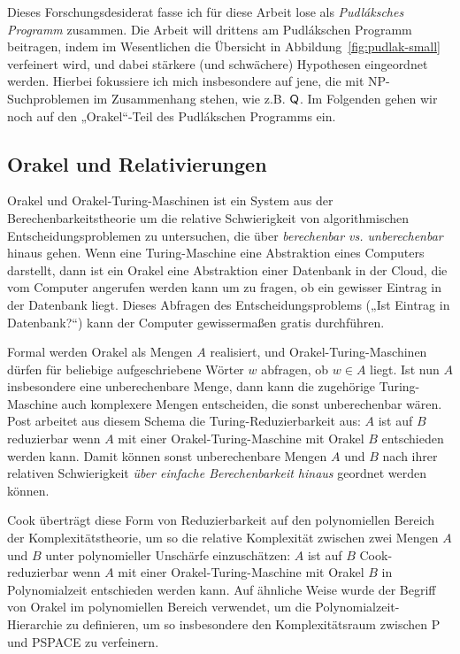 Dieses Forschungsdesiderat fasse ich für diese Arbeit lose als \emph{Pudláksches Programm} zusammen.
Die Arbeit will drittens am Pudlákschen Programm beitragen, indem im Wesentlichen die Übersicht in Abbildung~\ref{fig:pudlak-small} verfeinert wird, und dabei stärkere (und schwächere) Hypothesen eingeordnet werden. Hierbei fokussiere ich mich insbesondere auf jene, die mit NP-Suchproblemen im Zusammenhang stehen, wie z.B. $\mathsf{Q}$.
Im Folgenden gehen wir noch auf den „Orakel“-Teil des Pudlákschen Programms ein.

\subsection*{Orakel und Relativierungen}

Orakel und Orakel-Turing-Maschinen ist ein System aus der Berechenbarkeitstheorie um die relative Schwierigkeit von algorithmischen Entscheidungsproblemen zu untersuchen, die über \emph{berechenbar vs. unberechenbar} hinaus gehen. Wenn eine Turing-Maschine eine Abstraktion eines Computers darstellt, dann ist ein Orakel eine Abstraktion einer Datenbank in der Cloud, die vom Computer angerufen werden kann um zu fragen, ob ein gewisser Eintrag in der Datenbank liegt. Dieses Abfragen des Entscheidungsproblems („Ist Eintrag in Datenbank?“) kann der Computer gewissermaßen gratis durchführen.

Formal werden Orakel als Mengen $A$ realisiert, und Orakel-Turing-Maschinen dürfen für beliebige aufgeschriebene Wörter $w$ abfragen, ob $w\in A$ liegt. Ist nun $A$ insbesondere eine unberechenbare Menge, dann kann die zugehörige Turing-Maschine auch komplexere Mengen entscheiden, die sonst unberechenbar wären.
Post arbeitet aus diesem Schema die Turing-Reduzierbarkeit aus: $A$ ist auf $B$ reduzierbar wenn $A$ mit einer Orakel-Turing-Maschine mit Orakel $B$ entschieden werden kann. Damit können sonst unberechenbare Mengen $A$ und $B$ nach ihrer relativen Schwierigkeit \emph{über einfache Berechenbarkeit hinaus} geordnet werden können. 

Cook überträgt diese Form von Reduzierbarkeit auf den polynomiellen Bereich der Komplexitätstheorie, um so die relative Komplexität zwischen zwei Mengen $A$ und $B$ unter polynomieller Unschärfe einzuschätzen: $A$ ist auf $B$ Cook-reduzierbar wenn $A$ mit einer Orakel-Turing-Maschine mit Orakel $B$ in Polynomialzeit entschieden werden kann. Auf ähnliche Weise wurde der Begriff von Orakel im polynomiellen Bereich verwendet, um die Polynomialzeit-Hierarchie zu definieren, um so insbesondere den Komplexitätsraum zwischen P und PSPACE zu verfeinern.

